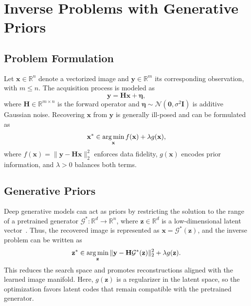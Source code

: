 \documentclass[conference]{IEEEtran}
\DeclareMathOperator*{\argmin}{arg\,min}
\begin{document}


\section{Inverse Problems with Generative Priors}

\subsection{Problem Formulation}

Let $\mathbf{x} \in \mathbb{R}^{n}$ denote a vectorized image and $\mathbf{y} \in \mathbb{R}^{m}$ its corresponding observation, with $m \leq n$. The acquisition process is modeled as
\vspace{-2mm}
\begin{equation}
    \mathbf{y} = \mathbf{H}\mathbf{x} + \boldsymbol{\eta},
    \label{eq:forward_model}
\end{equation}
where $\mathbf{H} \in \mathbb{R}^{m \times n}$ is the forward operator and 
$\boldsymbol{\eta} \sim \mathcal{N}(\mathbf{0},\sigma^2\mathbf{I})$ is additive Gaussian noise. Recovering $\mathbf{x}$ from $\mathbf{y}$ is generally ill-posed and can be formulated as
\vspace{-2mm}
\begin{equation}
    \mathbf{x}^{\ast} \in 
    \argmin_{\mathbf{x}}
    f(\mathbf{x}) + \lambda g(\mathbf{x}),
    \label{eq:inverse_problem}
    \vspace{-2mm}
\end{equation}
where $f(\mathbf{x})=\|\mathbf{y}-\mathbf{H}\mathbf{x}\|_2^2$ enforces data fidelity, 
$g(\mathbf{x})$ encodes prior information, and $\lambda>0$ balances both terms.

\subsection{Generative Priors}

Deep generative models can act as priors by restricting the solution to the range of a pretrained generator $\mathcal{G}^{\ast}:\mathbb{R}^{d}\rightarrow\mathbb{R}^{n}$, where 
$\mathbf{z}\in\mathbb{R}^{d}$ is a low-dimensional latent vector~\cite{bora2017compressed}. Thus, the recovered image is represented as $\mathbf{x}=\mathcal{G}^{\ast}(\mathbf{z})$, and the inverse problem can be written as
\vspace{-2mm}
\begin{equation}
    \mathbf{z}^{\ast} \in 
    \argmin_{\mathbf{z}}
    \|\mathbf{y}-\mathbf{H}\mathcal{G}^{\ast}(\mathbf{z})\|_2^2 + \lambda g(\mathbf{z}).
    \label{eq:generative_prior}
    \vspace{-2mm}
\end{equation}
This reduces the search space and promotes reconstructions aligned with the learned image manifold. Here, $g(\mathbf{z})$ is a regularizer in the latent space, so the optimization favors latent codes that remain compatible with the pretrained generator.
\end{document}
